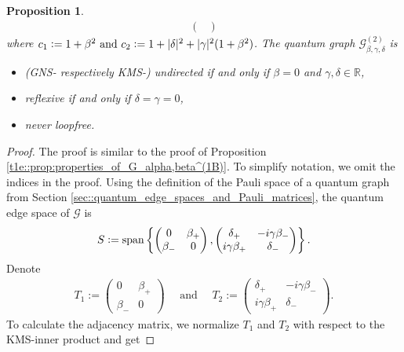 \documentclass{amsart}
\newtheorem{proposition}[thm]{Proposition}
\newcommand{\R}{\mathbb{R}}
\DeclareMathOperator{\spann}{span}
\begin{document}
\begin{proposition}
\begin{align*}
\begin{pmatrix}
            \end{pmatrix}
    \end{align*}
    where
        $c_1\vcentcolon=1+\beta^2
        \text{ and }
        c_2\vcentcolon=1+|\delta|^2+|\gamma|^2(1+\beta^2)$.
    The quantum graph $\mathcal{G}_{\beta,\gamma,\delta}^{(2)}$ is
    \begin{itemize}
        \item (GNS- respectively KMS-) undirected if and only if $\beta=0$ and $\gamma,\delta\in\R$, 
        \item reflexive if and only if $\delta=\gamma=0$,
        \item never loopfree.
    \end{itemize}
\end{proposition}

\begin{proof}
    The proof is similar to the proof of Proposition \ref{t1e::prop:properties_of_G_alpha,beta^(1B)}.
    To simplify notation, we omit the indices in the proof.
    Using the definition of the Pauli space of a quantum graph from Section \ref{sec::quantum_edge_spaces_and_Pauli_matrices}, the quantum edge space of $\mathcal{G}$ is
    \begin{align*}
        S \vcentcolon
        =
        \spann\left\{
            \begin{pmatrix}
                0&\beta_+\\
                \beta_-&0
            \end{pmatrix},
            \begin{pmatrix}
                \delta_+&-i\gamma\beta_-\\
                i\gamma\beta_+&\delta_-
            \end{pmatrix}
            \right\}.
    \end{align*}
    Denote
    \begin{align*}
        T_1 := \begin{pmatrix}
                0&\beta_+\\
                \beta_-&0
            \end{pmatrix}
        \quad \text{ and } \quad 
        T_2 := \begin{pmatrix}
                \delta_+&-i\gamma\beta_-\\
                i\gamma\beta_+&\delta_-
            \end{pmatrix}.
    \end{align*}
    To calculate the adjacency matrix, we normalize $T_1$ and $T_2$ with respect to the KMS-inner product and get

\end{proof}
\end{document}
